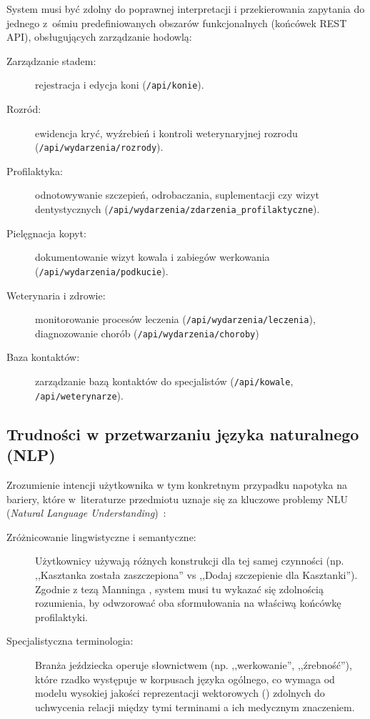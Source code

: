 System musi być zdolny do poprawnej interpretacji i przekierowania zapytania do jednego z~ośmiu predefiniowanych obszarów funkcjonalnych (końcówek REST API), obsługujących zarządzanie hodowlą:
\begin{description}
    \item[Zarządzanie stadem:] rejestracja i edycja koni (\texttt{/api/konie}).
    \item[Rozród:] ewidencja kryć, wyźrebień i kontroli weterynaryjnej rozrodu (\texttt{/api/wydarzenia/rozrody}).
    \item[Profilaktyka:] odnotowywanie szczepień, odrobaczania, suplementacji czy wizyt dentystycznych (\texttt{/api/wydarzenia/zdarzenia\_profilaktyczne}).
    \item[Pielęgnacja kopyt:] dokumentowanie wizyt kowala i zabiegów werkowania (\texttt{/api/wydarzenia/\allowbreak{}podkucie}).
    \item[Weterynaria i zdrowie:] monitorowanie procesów leczenia (\texttt{/api/wydarzenia/leczenia}), diagnozowanie chorób (\texttt{/api/wydarzenia/choroby})
    \item[Baza kontaktów:] zarządzanie bazą kontaktów do specjalistów (\texttt{/api/kowale}, \texttt{/api/weterynarze}).
\end{description}

\subsection*{Trudności w przetwarzaniu języka naturalnego (NLP)}

Zrozumienie intencji użytkownika w tym konkretnym przypadku napotyka na bariery, które w~literaturze przedmiotu uznaje się za kluczowe problemy NLU (\textit{Natural Language Understanding})~\cite{jurafsky2023}:

\begin{description}
    \item[Zróżnicowanie lingwistyczne i semantyczne:] Użytkownicy używają różnych konstrukcji dla tej samej czynności (np. ,,Kasztanka została zaszczepiona'' vs ,,Dodaj szczepienie dla Kasztanki''). Zgodnie z tezą Manninga \cite{manning2008}, system musi tu wykazać się zdolnością rozumienia, by odwzorować oba sformułowania na właściwą końcówkę profilaktyki.
    
    \item[Specjalistyczna terminologia:] Branża jeździecka operuje słownictwem (np. ,,werkowanie'', ,,źrebność''), które rzadko występuje w korpusach języka ogólnego, co wymaga od modelu wysokiej jakości reprezentacji wektorowych () zdolnych do uchwycenia relacji między tymi terminami a ich medycznym znaczeniem.
\end{description}


